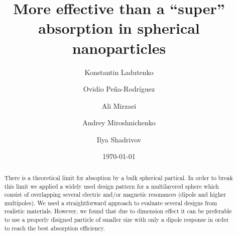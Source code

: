 \documentclass[aps,prl,twocolumn,showpacs,superscriptaddress,groupedaddress]{revtex4-1}
\begin{document}

\title{More effective than a ``super'' absorption in spherical nanoparticles}


\author{Konstantin Ladutenko} 


\author{Ovidio Pe\~{n}a-Rodr\'{i}guez} 


\author{Ali Mirzaei} 
\author{Andrey Miroshnichenko}
\author{Ilya Shadrivov}

\date{\today}

\begin{abstract}
  There is a theoretical limit for absoption by a bulk spherical
  partical.  In order to break this limit we applied a widely used
  design pattern for a multilayered sphere which consist of
  overlapping several electric and/or magnetic resonances (dipole
  and higher multipoles).  We used a straightforward approach to
  evaluate several designs from realistic materials.  However, we found that
  due to dimension effect it can be preferable to use a properly
  disigned particle of smaller size with only a dipole response in
  order to reach the best absorption efficiency.
\end{abstract}
\end{document}
